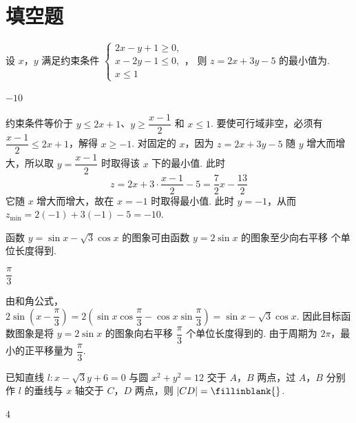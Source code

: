 \section{填空题}

\begin{problem}
设 \(x\)，\(y\) 满足约束条件
\(\begin{cases}
2x-y+1\ge0,\\
x-2y-1\le0,\\
x\le1
\end{cases}\)，
则 \(z=2x+3y-5\) 的最小值为\fillinblank{}.
\end{problem}

\begin{answer}
\(-10\)
\end{answer}

\begin{solution}
约束条件等价于 \(y\le2x+1\)、\(y\ge\dfrac{x-1}{2}\) 和 \(x\le1\). 要使可行域非空，必须有 \(\dfrac{x-1}{2}\le2x+1\)，解得 \(x\ge-1\). 对固定的 \(x\)，因为 \(z=2x+3y-5\) 随 \(y\) 增大而增大，所以取 \(y=\dfrac{x-1}{2}\) 时取得该 \(x\) 下的最小值. 此时
\[
z=2x+3\cdot\frac{x-1}{2}-5=\frac72x-\frac{13}{2}
\]
它随 \(x\) 增大而增大，故在 \(x=-1\) 时取得最小值. 此时 \(y=-1\)，从而 \(z_{\min}=2(-1)+3(-1)-5=-10\).
\end{solution}

\begin{problem}
函数 \(y=\sin x-\sqrt3\cos x\) 的图象可由函数 \(y=2\sin x\) 的图象至少向右平移\fillinblank{} 个单位长度得到.
\end{problem}

\begin{answer}
\(\dfrac{\pi}{3}\)
\end{answer}

\begin{solution}
由和角公式，\(2\sin\left(x-\dfrac\pi3\right)=2\left(\sin x\cos\dfrac\pi3-\cos x\sin\dfrac\pi3\right)=\sin x-\sqrt3\cos x\). 因此目标函数图象是将 \(y=2\sin x\) 的图象向右平移 \(\dfrac\pi3\) 个单位长度得到的. 由于周期为 \(2\pi\)，最小的正平移量为 \(\dfrac\pi3\).
\end{solution}

\begin{problem}
已知直线 \(l:x-\sqrt3 y+6=0\) 与圆 \(x^2+y^2=12\) 交于 \(A\)，\(B\) 两点，过 \(A\)，\(B\) 分别作 \(l\) 的垂线与 \(x\) 轴交于 \(C\)，\(D\) 两点，则 \(|CD|=\fillinblank{}\).
\end{problem}

\begin{answer}
\(4\)
\end{answer}

